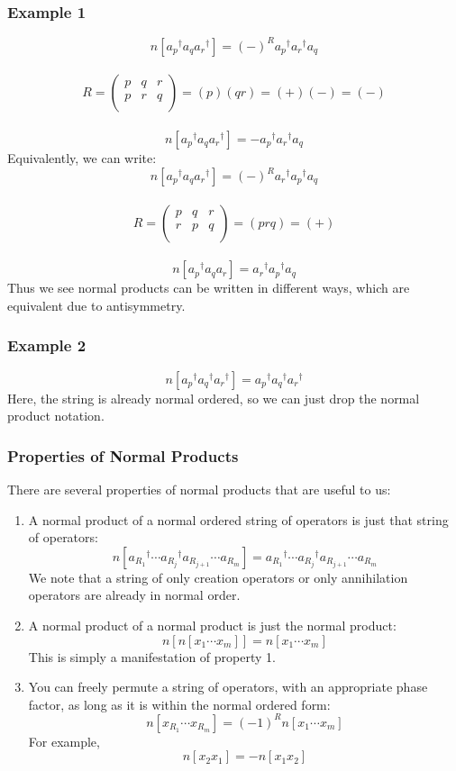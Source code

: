 \documentclass{article}
\newcommand{\dg}{\ensuremath{^\dagger} }
\newcommand{\cd}{\ensuremath{\cdots} }
\begin{document}
\subsubsection{Example 1}
\[n[a_p\dg a_q a_r \dg] = (-)^R a_p\dg a_r\dg a_q \]\\
\[
R = 
\begin{pmatrix}
p & q & r  \\
p & r & q  \\
\end{pmatrix}
= (p)(qr) = (+)(-) = (-)
\] \\
\[n[a_p\dg a_q a_r \dg] = - a_p\dg a_r\dg a_q \]
Equivalently, we can write: 
\[n[a_p\dg a_q a_r\dg ] = (-)^R a_r\dg a_p\dg a_q \]\\
\[
R = 
\begin{pmatrix}
p & q & r  \\
r & p & q  \\
\end{pmatrix}
= (prq) = (+) 
\] \\
\[n[a_p\dg a_q a_r ] =  a_r\dg a_p\dg a_q \]
Thus we see normal products can be written in different ways, which are equivalent due to antisymmetry.
\subsubsection{Example 2}
\[ n[a_p\dg a_q\dg a_r\dg] = a_p\dg a_q\dg a_r\dg \]
Here, the string is already normal ordered, so we can just drop the normal product notation. 
\subsubsection{Properties of Normal Products}
There are several properties of normal products that are useful to us: 
\begin{enumerate}
\item A normal product of a normal ordered string of operators is just that string of operators:
\[n[a_{R_1}\dg \cd a_{R_j}\dg a_{R_{j+1}} \cd a_{R_m} ] = a_{R_1}\dg \cd a_{R_j}\dg a_{R_{j+1}} \cd a_{R_m}  \]
We note that a string of only creation operators or only annihilation operators are already in normal order. 
\item A normal product of a normal product is just the normal product: 
\[n[n[x_1 \cd x_m]] = n[x_1 \cd x_m] \]
This is simply a manifestation of property 1. 
\item You can freely permute a string of operators, with an appropriate phase factor, as long as it is within the normal ordered form:
\[n[x_{R_1} \cd x_{R_m} ] = (-1)^R n[ x_1 \cd x_m]\]
For example,
\[n[x_2 x_1] = -n[x_1 x_2] \]
\end{enumerate}
\end{document}
